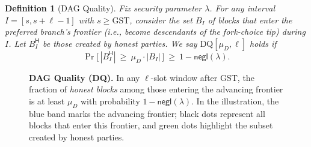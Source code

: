 \documentclass[11pt]{article}
\newtheorem{definition}[theorem]{Definition}
\newcommand{\negl}{\ensuremath{\mathsf{negl}}\xspace}
\begin{document}
\begin{definition}[DAG Quality]
Fix security parameter $\lambda$. For any interval $I=[s,s+\ell-1]$ with $s\ge \mathrm{GST}$, consider the set $B_I$ of blocks that enter the preferred branch's frontier (i.e., become descendants of the fork-choice tip) during $I$. Let $B_I^{\mathsf{H}}$ be those created by honest parties.
We say $\mathrm{DQ}[\mu_D,\ell]$ holds if
\begin{equation*}
\Pr\big[\,|B_I^{\mathsf{H}}|\ \ge\ \mu_D \cdot |B_I|\,\big]\ \ge\ 1-\negl(\lambda).
\end{equation*}
\end{definition}

\begin{figure}[htp!]
\centering
{}
\caption{\textbf{DAG Quality (DQ).} 
\small 
In any $\ell$-slot window after GST, the fraction of \emph{honest blocks} among those entering the advancing frontier is at least $\mu_D$ with probability $1-\negl(\lambda)$. 
In the illustration, the blue band marks the advancing frontier; 
black dots represent all blocks that enter this frontier, 
and green dots highlight the subset created by honest parties.}

\label{fig:dq}
\end{figure}
\end{document}
